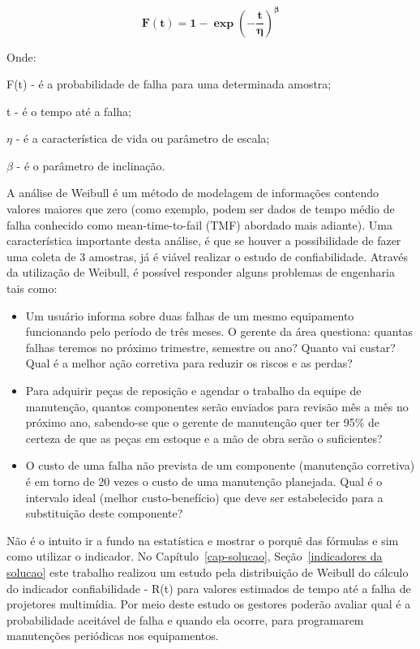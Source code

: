 \begin{equation}
\label{eqn01}
	\mathbf{F(t)} = \mathbf{1} - \mathbf{\exp{(-\frac{t}{\eta})^\beta}} 
\end{equation}

Onde:

F(t) - é a probabilidade de falha para uma determinada amostra;

t - é o tempo até a falha;

$ \eta $ - é a característica de vida ou parâmetro de escala;

$ \beta $ - é o parâmetro de inclinação.

\pagebreak

A análise de Weibull é um método de modelagem de informações contendo valores maiores que zero (como exemplo, podem ser dados de tempo médio de falha conhecido como mean-time-to-fail (TMF) abordado mais adiante). Uma característica importante desta análise, é que se houver a possibilidade de fazer uma coleta de 3 amostras, já é viável realizar o estudo de confiabilidade. Através da utilização de Weibull, é possível responder alguns problemas de engenharia tais como:

\begin{itemize}
	\item Um usuário informa sobre duas falhas de um mesmo equipamento funcionando pelo período de três meses. O gerente da área questiona: quantas falhas teremos no próximo trimestre, semestre ou ano? Quanto vai custar? Qual é a melhor ação corretiva para reduzir os riscos e as perdas?
	\item Para adquirir peças de reposição e agendar o trabalho da equipe de manutenção, quantos componentes serão enviados para revisão mês a mês no próximo ano, sabendo-se que o gerente de manutenção quer ter 95\% de certeza de que as peças em estoque e a mão de obra serão o suficientes?
	\item O custo de uma falha não prevista de um componente (manutenção corretiva) é em torno de 20 vezes o custo de uma manutenção planejada. Qual é o intervalo ideal (melhor custo-benefício) que deve ser estabelecido para a substituição deste componente?
\end{itemize}

Não é o intuito ir a fundo na estatística e mostrar o porquê das fórmulas e sim como utilizar o indicador. No Capítulo~\ref{cap-solucao}, Seção~\ref{indicadores da solucao} este trabalho realizou um estudo pela distribuição de Weibull do cálculo do indicador confiabilidade - R(t) para valores estimados de tempo até a falha de projetores multimídia. Por meio deste estudo os gestores poderão avaliar qual é a probabilidade aceitável de falha e quando ela ocorre, para programarem manutenções periódicas nos equipamentos.

